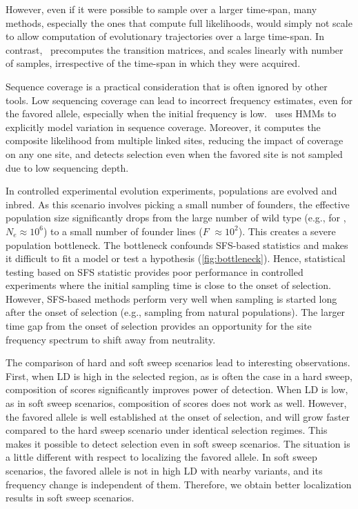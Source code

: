 However, even if it were possible to sample over a larger time-span,
many methods, especially the ones that compute full likelihoods, would
simply not scale to allow computation of evolutionary trajectories
over a large time-span. In contrast, \comale\ precomputes the
transition matrices, and scales linearly with number of samples,
irrespective of the time-span in which they were acquired.

Sequence coverage is a practical consideration that is often ignored
by other tools. Low sequencing coverage can lead to incorrect
frequency estimates, even for the favored allele, especially when the
initial frequency is low. \comale\ uses HMMs to explicitly model
variation in sequence coverage. Moreover, it computes the composite
likelihood from multiple linked sites, reducing the impact of coverage
on any one site, and detects selection even when the favored site is
not sampled due to low sequencing depth.


In controlled experimental evolution experiments, populations are
evolved and inbred. As this scenario involves picking a small number
of founders, the effective population size significantly drops from
the large number of wild type (e.g., for \dmel, $N_e\approx10^6$) to a
small number of founder lines ($F$ $\approx 10^2$). This creates a severe 
population
bottleneck. The bottleneck confounds SFS-based statistics and makes
it difficult to fit a model or test a hypothesis
(\ref{fig:bottleneck}).  Hence, statistical testing based
on SFS statistic provides poor performance in controlled experiments
where the initial sampling time is close to the onset of selection.
However, SFS-based methods perform very well when sampling is started
long after the onset of selection (e.g., sampling from natural
populations). The larger time gap from the onset of selection provides
an opportunity for the site frequency spectrum to shift away from
neutrality.



The comparison of hard and soft sweep scenarios lead to interesting
observations. First, when LD is high in the selected region, as is
often the case in a hard sweep, composition of scores significantly
improves power of detection. When LD is low, as in soft sweep
scenarios, composition of scores does not work as well. However, the
favored allele is well established at the onset of selection, and will
grow faster compared to the hard sweep scenario under identical
selection regimes. This makes it possible to detect selection even in
soft sweep scenarios. The situation is a little different with respect
to localizing the favored allele. In soft sweep scenarios, the favored
allele is not in high LD with nearby variants, and its frequency
change is independent of them. Therefore, we obtain better
localization results in soft sweep scenarios.

